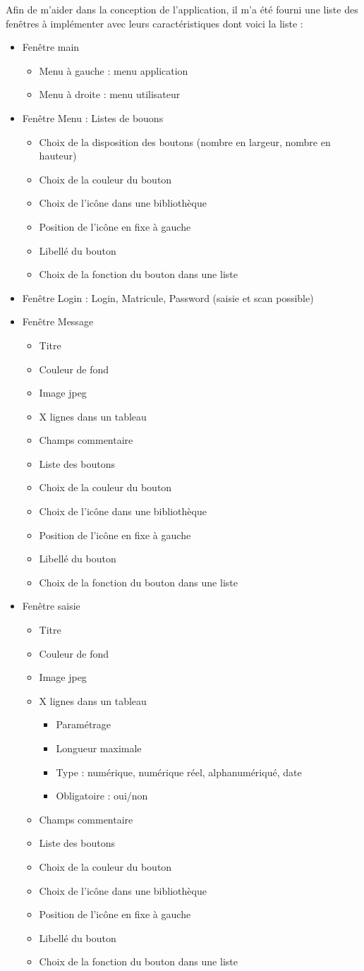 \documentclass[a4paper, 12pt, french]{article}
\newcommand{\bdot}{\item[\color{ssiYellow}\ding{108}]}
\newcommand{\bdotoutlined}{\item[\color{ssiYellow}\ding{109}]}
\newcommand{\bsquare}{\item[\color{ssiYellow}\ding{110}]}
\begin{document}
		Afin de m'aider dans la conception de l'application, il m'a été fourni une liste des fenêtres à implémenter avec leurs caractéristiques dont voici la liste :
		\begin{itemize}
			\bdot{Fenêtre main}
				\begin{itemize}
					\bdotoutlined{Menu à gauche : menu application}
					\bdotoutlined{Menu à droite : menu utilisateur}
				\end{itemize}
			\bdot{Fenêtre Menu : Listes de bouons}
				\begin{itemize}
					\bdotoutlined{Choix de la disposition des boutons (nombre en largeur, nombre en hauteur)}
					\bdotoutlined{Choix de la couleur du bouton}
					\bdotoutlined{Choix de l'icône dans une bibliothèque}
					\bdotoutlined{Position de l'icône en fixe à gauche}
					\bdotoutlined{Libellé du bouton}
					\bdotoutlined{Choix de la fonction du bouton dans une liste}
				\end{itemize}
			\bdot{Fenêtre Login : Login, Matricule, Password (saisie et scan possible)}
			\bdot{Fenêtre Message}
				\begin{itemize}
					\bdotoutlined{Titre}
					\bdotoutlined{Couleur de fond}
					\bdotoutlined{Image jpeg}
					\bdotoutlined{X lignes dans un tableau}
					\bdotoutlined{Champs commentaire}
					\bdotoutlined{Liste des boutons}
					\bdotoutlined{Choix de la couleur du bouton}
					\bdotoutlined{Choix de l'icône dans une bibliothèque}
					\bdotoutlined{Position de l'icône en fixe à gauche}
					\bdotoutlined{Libellé du bouton}
					\bdotoutlined{Choix de la fonction du bouton dans une liste}
				\end{itemize}
			\bdot{Fenêtre saisie}
				\begin{itemize}
					\bdotoutlined{Titre}
					\bdotoutlined{Couleur de fond}
					\bdotoutlined{Image jpeg}
					\bdotoutlined{X lignes dans un tableau}
						\begin{itemize}
							\bsquare{Paramétrage}
							\bsquare{Longueur maximale}
							\bsquare{Type : numérique, numérique réel, alphanumériqué, date}
							\bsquare{Obligatoire : oui/non}
						\end{itemize}
					\bdotoutlined{Champs commentaire}
					\bdotoutlined{Liste des boutons}
					\bdotoutlined{Choix de la couleur du bouton}
					\bdotoutlined{Choix de l'icône dans une bibliothèque}
					\bdotoutlined{Position de l'icône en fixe à gauche}
					\bdotoutlined{Libellé du bouton}
					\bdotoutlined{Choix de la fonction du bouton dans une liste}
				\end{itemize}

\end{itemize}
\end{document}
